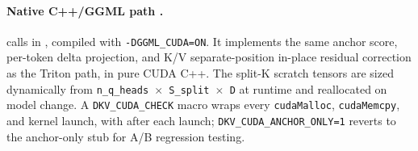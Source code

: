 \paragraph{Native C++/GGML path \pendingGPU{}.}
 calls  in ,
compiled with \texttt{-DGGML\_CUDA=ON}. It implements the same anchor score, per-token delta
projection, and K/V separate-position in-place residual correction as the Triton path, in pure
CUDA C++. The split-K scratch tensors are sized dynamically from
\texttt{n\_q\_heads $\times$ S\_split $\times$ D} at runtime and reallocated on model change.
A \texttt{DKV\_CUDA\_CHECK} macro wraps every \texttt{cudaMalloc}, \texttt{cudaMemcpy}, and
kernel launch, with  after each launch; \texttt{DKV\_CUDA\_ANCHOR\_ONLY=1}
reverts to the anchor-only stub for A/B regression testing.
